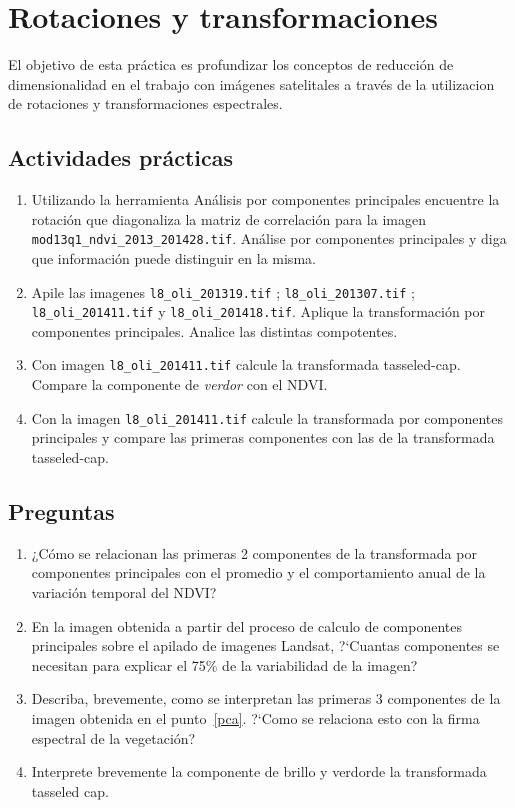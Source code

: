 \documentclass[hidelinks,12pt]{article}
\begin{document}
\section{Rotaciones y transformaciones}
El objetivo de esta práctica es  profundizar los conceptos de reducción
de dimensionalidad en el trabajo con imágenes satelitales a través de la
utilizacion de rotaciones y transformaciones espectrales.

\subsection{Actividades pr\'acticas}\label{rot:pra}
\begin{enumerate}
    \item Utilizando la herramienta Análisis por componentes principales
        encuentre la rotación que diagonaliza la matriz de correlación para la
        imagen \texttt{mod13q1\_ndvi\_2013\_2014\-28.tif}. Análise 
        por componentes principales y diga que información puede distinguir en la 
        misma. 
    \item \label{pca} Apile las imagenes
        \texttt{l8\_oli\_2013\-19.tif}
        ; \texttt{l8\_oli\_2013\-07.tif}
        ; \texttt{l8\_oli\_2014\-11.tif}
        y \texttt{l8\_oli\-\_2014\-18.tif}.
        Aplique la transformaci\'on por componentes principales.
        Analice las distintas compotentes.
    \item Con imagen \texttt{l8\_oli\_2014\-11.tif} calcule la 
        transformada tasseled-cap. Compare la componente de \emph{verdor} con
        el NDVI\@.
    \item Con la imagen \texttt{l8\_oli\_2014\-11.tif} calcule la 
        transformada por componentes principales y compare las primeras
        componentes con las de la transformada tasseled-cap.
\end{enumerate}

\subsection{Preguntas}
\begin{enumerate}
    \item ¿Cómo se relacionan las primeras 2 componentes de la transformada por
        componentes principales con el promedio y el comportamiento anual de la
        variaci\'on temporal del NDVI\@? 
    \item En la imagen obtenida a partir del proceso de calculo de componentes
        principales sobre el apilado de imagenes Landsat, ?`Cuantas componentes
        se necesitan para explicar el 75\% de la variabilidad de la imagen?
    \item Describa, brevemente, como se interpretan las primeras 3 componentes
        de la imagen obtenida en el punto~\ref{pca}. ?`Como se relaciona esto con la
        firma espectral de la vegetaci\'on?
    \item Interprete brevemente la componente de brillo y verdorde la transformada
        tasseled cap.
\end{enumerate}
\end{document}
